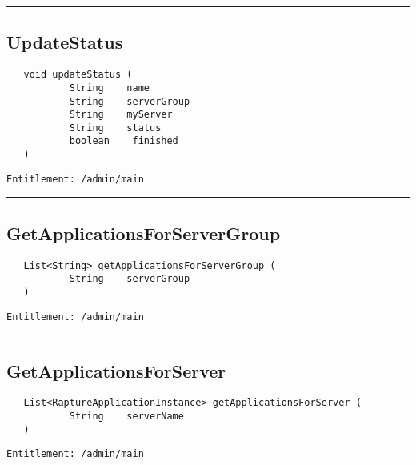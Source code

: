 \rule{12cm}{2pt}
\subsection{UpdateStatus}
\label{Api:UpdateStatus}
\begin{Verbatim}
   void updateStatus (
           String    name
           String    serverGroup
           String    myServer
           String    status
           boolean    finished
   )
\end{Verbatim}
\begin{Verbatim}[formatcom=\color{Maroon}]
  Entitlement: /admin/main
\end{Verbatim}



\rule{12cm}{2pt}
\subsection{GetApplicationsForServerGroup}
\label{Api:GetApplicationsForServerGroup}
\begin{Verbatim}
   List<String> getApplicationsForServerGroup (
           String    serverGroup
   )
\end{Verbatim}
\begin{Verbatim}[formatcom=\color{Maroon}]
  Entitlement: /admin/main
\end{Verbatim}



\rule{12cm}{2pt}
\subsection{GetApplicationsForServer}
\label{Api:GetApplicationsForServer}
\begin{Verbatim}
   List<RaptureApplicationInstance> getApplicationsForServer (
           String    serverName
   )
\end{Verbatim}
\begin{Verbatim}[formatcom=\color{Maroon}]
  Entitlement: /admin/main
\end{Verbatim}



